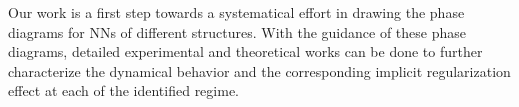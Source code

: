 \documentclass[twoside,11pt]{article}
\begin{document}

Our work is a first step towards a systematical effort in drawing the phase diagrams for NNs of different structures. With the guidance of these phase diagrams, detailed experimental and theoretical works can be done to further characterize the dynamical behavior and the corresponding implicit regularization effect at each of the identified regime.



\end{document}
